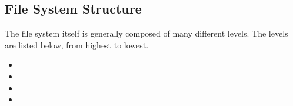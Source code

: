 \subsection{File System Structure}\label{subsec:File_System_Structure}
The file system itself is generally composed of many different levels.
The levels are listed below, from highest to lowest.
\begin{itemize}[noitemsep]
\item {}
\item {}
\item {}
\item {}
\end{itemize}


